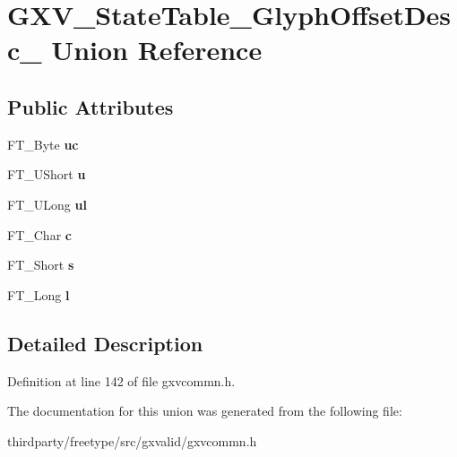 \hypertarget{union_g_x_v___state_table___glyph_offset_desc__}{}\section{G\+X\+V\+\_\+\+State\+Table\+\_\+\+Glyph\+Offset\+Desc\+\_\+ Union Reference}
\label{union_g_x_v___state_table___glyph_offset_desc__}
\subsection*{Public Attributes}
\begin{DoxyCompactItemize}
\item 
\mbox{\label{union_g_x_v___state_table___glyph_offset_desc___a36bb2ee89327d873cf8cabdf6ecccac2}} 
F\+T\+\_\+\+Byte {\bfseries uc}
\item 
\mbox{\label{union_g_x_v___state_table___glyph_offset_desc___ac2a262ca15d7f24b04024756062c9bdb}} 
F\+T\+\_\+\+U\+Short {\bfseries u}
\item 
\mbox{\label{union_g_x_v___state_table___glyph_offset_desc___ae11eda9897da9cba00f0c992d4157fb7}} 
F\+T\+\_\+\+U\+Long {\bfseries ul}
\item 
\mbox{\label{union_g_x_v___state_table___glyph_offset_desc___a98232fa40ff99e63b85cedd84241709f}} 
F\+T\+\_\+\+Char {\bfseries c}
\item 
\mbox{\label{union_g_x_v___state_table___glyph_offset_desc___ae95326a3bf51d1747e21fb5bc9e9ddeb}} 
F\+T\+\_\+\+Short {\bfseries s}
\item 
\mbox{\label{union_g_x_v___state_table___glyph_offset_desc___af30fd6d6bc498920936734b131a4ef45}} 
F\+T\+\_\+\+Long {\bfseries l}
\end{DoxyCompactItemize}


\subsection{Detailed Description}


Definition at line 142 of file gxvcommn.\+h.



The documentation for this union was generated from the following file\+:\begin{DoxyCompactItemize}
\item 
thirdparty/freetype/src/gxvalid/gxvcommn.\+h\end{DoxyCompactItemize}
